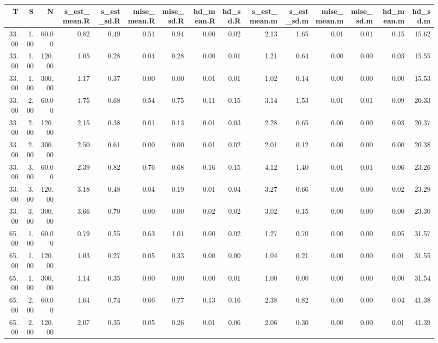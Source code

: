 \begin{table}[ht]
\centering
\begin{tabular}{rrrrrrrrrrrrrrr}
  \hline
T & S & N & s\_est\_mean.R & s\_est\_sd.R & mise\_mean.R & mise\_sd.R & hd\_mean.R & hd\_sd.R & s\_est\_mean.m & s\_est\_sd.m & mise\_mean.m & mise\_sd.m & hd\_mean.m & hd\_sd.m \\ 
  \hline
33.00 & 1.00 & 60.00 & 0.82 & 0.49 & 0.51 & 0.94 & 0.00 & 0.02 & 2.13 & 1.65 & 0.01 & 0.01 & 0.15 & 15.62 \\ 
  33.00 & 1.00 & 120.00 & 1.05 & 0.28 & 0.04 & 0.28 & 0.00 & 0.01 & 1.21 & 0.64 & 0.00 & 0.00 & 0.03 & 15.55 \\ 
  33.00 & 1.00 & 300.00 & 1.17 & 0.37 & 0.00 & 0.00 & 0.01 & 0.01 & 1.02 & 0.14 & 0.00 & 0.00 & 0.00 & 15.53 \\ 
  33.00 & 2.00 & 60.00 & 1.75 & 0.68 & 0.54 & 0.75 & 0.11 & 0.15 & 3.14 & 1.53 & 0.01 & 0.01 & 0.09 & 20.33 \\ 
  33.00 & 2.00 & 120.00 & 2.15 & 0.38 & 0.01 & 0.13 & 0.01 & 0.03 & 2.28 & 0.65 & 0.00 & 0.00 & 0.03 & 20.37 \\ 
  33.00 & 2.00 & 300.00 & 2.50 & 0.61 & 0.00 & 0.00 & 0.01 & 0.02 & 2.01 & 0.12 & 0.00 & 0.00 & 0.00 & 20.38 \\ 
  33.00 & 3.00 & 60.00 & 2.39 & 0.82 & 0.76 & 0.68 & 0.16 & 0.15 & 4.12 & 1.40 & 0.01 & 0.01 & 0.06 & 23.26 \\ 
  33.00 & 3.00 & 120.00 & 3.18 & 0.48 & 0.04 & 0.19 & 0.01 & 0.04 & 3.27 & 0.66 & 0.00 & 0.00 & 0.02 & 23.29 \\ 
  33.00 & 3.00 & 300.00 & 3.66 & 0.70 & 0.00 & 0.00 & 0.02 & 0.02 & 3.02 & 0.15 & 0.00 & 0.00 & 0.00 & 23.30 \\ 
  65.00 & 1.00 & 60.00 & 0.79 & 0.55 & 0.63 & 1.01 & 0.00 & 0.02 & 1.27 & 0.70 & 0.00 & 0.00 & 0.05 & 31.57 \\ 
  65.00 & 1.00 & 120.00 & 1.03 & 0.27 & 0.05 & 0.33 & 0.00 & 0.00 & 1.04 & 0.21 & 0.00 & 0.00 & 0.01 & 31.55 \\ 
  65.00 & 1.00 & 300.00 & 1.14 & 0.35 & 0.00 & 0.00 & 0.00 & 0.01 & 1.00 & 0.00 & 0.00 & 0.00 & 0.00 & 31.54 \\ 
  65.00 & 2.00 & 60.00 & 1.64 & 0.74 & 0.66 & 0.77 & 0.13 & 0.16 & 2.38 & 0.82 & 0.00 & 0.00 & 0.04 & 41.38 \\ 
  65.00 & 2.00 & 120.00 & 2.07 & 0.35 & 0.05 & 0.26 & 0.01 & 0.06 & 2.06 & 0.30 & 0.00 & 0.00 & 0.01 & 41.39 \\ 

\end{tabular}
\end{table}
